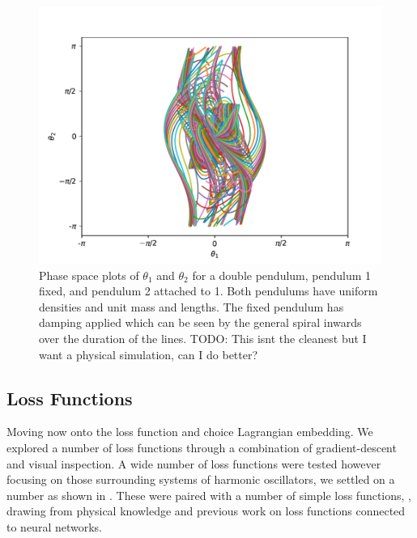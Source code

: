\begin{figure}[t]
  \label{fig:ddp}
  \includegraphics[width=\columnwidth]{figures/damped-double-pendulum.pdf}
  \caption{Phase space plots of $\theta_1$ and $\theta_2$ for a double pendulum, pendulum 1 fixed, and pendulum 2 attached to 1. Both pendulums have uniform densities and unit mass and lengths. The fixed pendulum has damping applied which can be seen by the general spiral inwards over the duration of the lines. TODO: This isnt the cleanest but I want a physical simulation, can I do better?}
\end{figure}

%
%


\subsection{Loss Functions}
\label{sec:res-lf}

Moving now onto the loss function and choice Lagrangian embedding. We explored a number of loss functions through a combination of gradient-descent and visual inspection. A wide number of loss functions were tested however focusing on those surrounding systems of harmonic oscillators, we settled on a number as shown in . These were paired with a number of simple loss functions, , drawing from physical knowledge and previous work on loss functions connected to neural networks.

